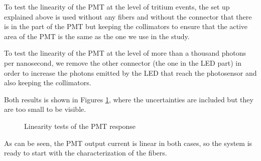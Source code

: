 To test the linearity of the PMT at the level of tritium events, the set up explained above is used without any fibers and without the connector that there is in the part of the PMT but keeping the collimators to ensure that the active area of the PMT is the same as the one we use in the study. 

To test the linearity of the PMT at the level of more than a thousand photons per nanosecond, we remove the other connector (the one in the LED part) in order to increase the photons emitted by the LED that reach the photosensor and also keeping the collimators.

Both results is shown in Figures \ref{fig:LinearityRangesOfPMT}, where the uncertainties are included but they are too small to be visible.

\begin{figure}[h]
 \centering
    \newline
 \caption{Linearity tests of the PMT response}
 \label{fig:LinearityRangesOfPMT}
\end{figure}

As can be seen, the PMT output current is linear in both cases, so the system is ready to start with the characterization of the fibers.